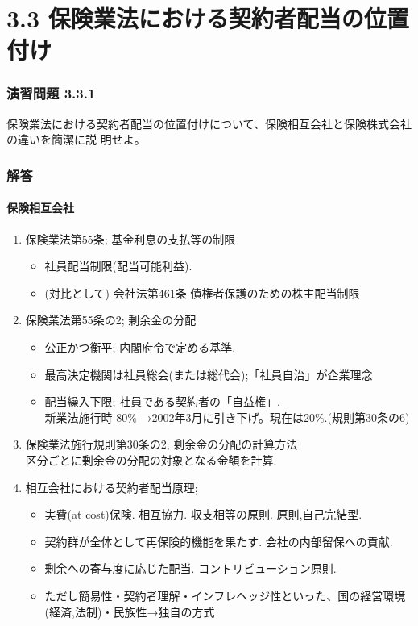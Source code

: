\documentclass[report,gutter=10mm,fore-edge=10mm,uplatex,dvipdfmx]{jlreq}
\begin{document}
\section{3.3 保険業法における契約者配当の位置付け}
\subsubsection{演習問題 3.3.1}
保険業法における契約者配当の位置付けについて、保険相互会社と保険株式会社の違いを簡潔に説
明せよ。
\subsubsection{解答}
\paragraph{保険相互会社}
\begin{enumerate}
 \item 保険業法第55条; 基金利息の支払等の制限
\begin{itemize}
 \item 社員配当制限(配当可能利益). 
 \item (対比として) 会社法第461条 債権者保護のための株主配当制限
\end{itemize}
 \item 保険業法第55条の2; 剰余金の分配
\begin{itemize}
 \item 公正かつ衡平; 内閣府令で定める基準. 
 \item 最高決定機関は社員総会(または総代会);「社員自治」が企業理念
 \item 配当繰入下限; 社員である契約者の「自益権」.   \\
新業法施行時 80\% →2002年3月に引き下げ。現在は20\%.(規則第30条の6)
\end{itemize}
 \item 保険業法施行規則第30条の2; 剰余金の分配の計算方法\\
       区分ごとに剰余金の分配の対象となる金額を計算.  
 \item 相互会社における契約者配当原理;  
\begin{itemize}
 \item 実費(at cost)保険. 相互協力. 収支相等の原則. 原則,自己完結型. 
 \item 契約群が全体として再保険的機能を果たす. 会社の内部留保への貢献. 
 \item 剰余への寄与度に応じた配当. コントリビューション原則. 
 \item ただし簡易性・契約者理解・インフレヘッジ性といった、国の経営環境(経済,法制)・民族性→独自の方式
\end{itemize}
\end{enumerate}
\end{document}
